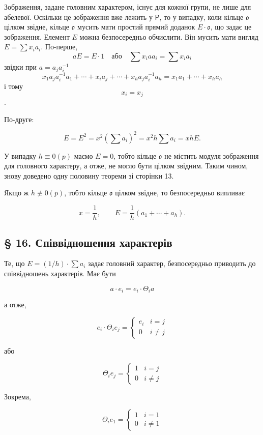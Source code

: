 \documentclass[11pt]{article}
\begin{document}
Зображення, задане головним характером, існує для кожної групи, не лише для абелевої. Оскільки це зображення вже лежить у \(\mathsf P\), то у випадку, коли кільце \(\mathfrak o\) цілком звідне, кільце \(\mathfrak o\) мусить мати простий прямий доданок \(E\cdot\mathfrak o\), що задає це зображення. Елемент \(E\) можна безпосередньо обчислити. Він мусить мати вигляд \(E=\sum x_i a_i\). По-перше,
\[
aE=E\cdot 1\quad\text{або}\quad \sum x_i a a_i=\sum x_i a_i
\]
звідки при \(a=a_j a_i^{-1}\)
\[
x_1a_ja_i^{-1}a_1+\cdots+x_i a_j+\cdots+x_ha_ja_i^{-1}a_h
=x_1a_1+\cdots+x_ha_h
\]
і тому
\[
x_i=x_j
\]
.

По-друге:

\[
E=E^2=x^2\left(\sum a_i\right)^2=x^2h\sum a_i=xhE.
\]

У випадку \(h\equiv0(p)\) маємо \(E=0\), тобто кільце \(\mathfrak o\) не містить модуля зображення для головного характеру, а отже, не могло бути цілком звідним. Таким чином, знову доведено одну половину теореми зі сторінки 13.

Якщо ж \(h\not\equiv0(p)\), тобто кільце \(\mathfrak o\) цілком звідне, то безпосередньо випливає

\[
x=\frac{1}{h},\qquad E=\frac{1}{h}(a_1+\cdots+a_h).
\]

\subsection*{§ 16. Співвідношення характерів}\label{die-charakterenrelationen}

Те, що \(E=(1/h)\cdot\sum a_i\) задає головний характер, безпосередньо приводить до співвідношень характерів. Має бути

\[a \cdot e_i = e_i \cdot \Theta_i a\]

а отже,

\[e_i \cdot \Theta_i e_j = \begin{cases} e_i & i = j \\ 0 & i \neq j \end{cases}\]

або

\[\Theta_i e_j = \begin{cases} 1 & i = j \\ 0 & i \neq j \end{cases}\]

Зокрема,

\[\Theta_i e_1 = \begin{cases} 1 & i = 1 \\ 0 & i \neq 1 \end{cases}\]
\end{document}

